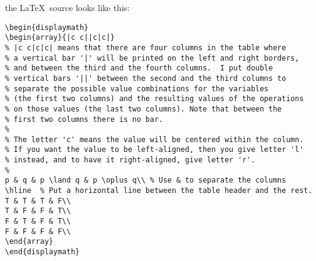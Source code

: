 \documentclass[12pt]{article}
\begin{document}
\noindent
the \LaTeX\ source looks like this:
\small{
\begin{verbatim}
\begin{displaymath}
\begin{array}{|c c||c|c|} 
% |c c|c|c| means that there are four columns in the table where 
% a vertical bar '|' will be printed on the left and right borders,
% and between the third and the fourth columns.  I put double  
% vertical bars '||' between the second and the third columns to 
% separate the possible value combinations for the variables  
% (the first two columns) and the resulting values of the operations  
% on those values (the last two columns). Note that between the 
% first two columns there is no bar.
% 
% The letter 'c' means the value will be centered within the column. 
% If you want the value to be left-aligned, then you give letter 'l'  
% instead, and to have it right-aligned, give letter 'r'.
%
p & q & p \land q & p \oplus q\\ % Use & to separate the columns
\hline  % Put a horizontal line between the table header and the rest.
T & T & T & F\\
T & F & F & T\\
F & T & F & T\\
F & F & F & F\\
\end{array}
\end{displaymath}
\end{verbatim}
}

\goodbreak
\end{document}
